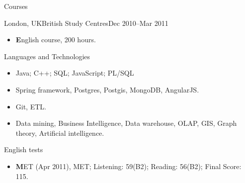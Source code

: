 \documentclass[]{mcdowellcv}
\begin{document}
	\begin{cvsection}{Courses}
		\begin{cvsubsection}{London,	UK}{British Study Centres}{Dec 2010--Mar 2011}	
			\begin{itemize}
				\item \textbf English course, 200 hours. 
			\end{itemize}
		\end{cvsubsection}
	\end{cvsection}	
		
	\begin{cvsection}{Languages and Technologies}
		\begin{cvsubsection}{}{}{}	
			\begin{itemize}
				\item Java; C++; SQL; JavaScript; PL/SQL 
				\item Spring framework, Postgres, Postgis, MongoDB, AngularJS.
				\item Git, ETL.
				\item Data mining, Business Intelligence, Data warehouse, OLAP, GIS, Graph theory, Artificial intelligence.				
			\end{itemize}
		\end{cvsubsection}
	\end{cvsection}
	
	\begin{cvsection}{English	tests}
		\begin{cvsubsection}{}{}{}	
			\begin{itemize}
				\item \textbf MET (Apr 2011), MET; Listening: 59(B2); Reading: 56(B2); Final	Score: 115. 
			\end{itemize}
		\end{cvsubsection}
	\end{cvsection}	

	
\end{document}
